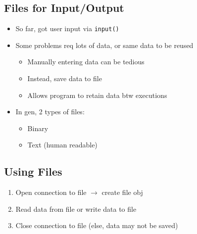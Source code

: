 \documentclass{article}
\begin{document}
\subsection{Files for Input/Output}
    \begin{multicols}{2}
        \begin{itemize}
            \item So far, got user input via \texttt{input()}
            \item Some problems req lots of data, or same data to be reused
                \begin{itemize}
                    \item Manually entering data can be tedious
                    \item Instead, save data to file
                    \item Allows program to retain data btw executions
                \end{itemize}
            \item In gen, 2 types of files:
                \begin{itemize}
                    \item Binary
                    \item Text (human readable)
                \end{itemize}
        \end{itemize}
    \end{multicols}

\subsection{Using Files}
    \begin{enumerate}
        \item Open connection to file $\rightarrow$ create file obj
        \item Read data from file or write data to file
        \item Close connection to file (else, data may not be saved)
    \end{enumerate}

\end{document}
